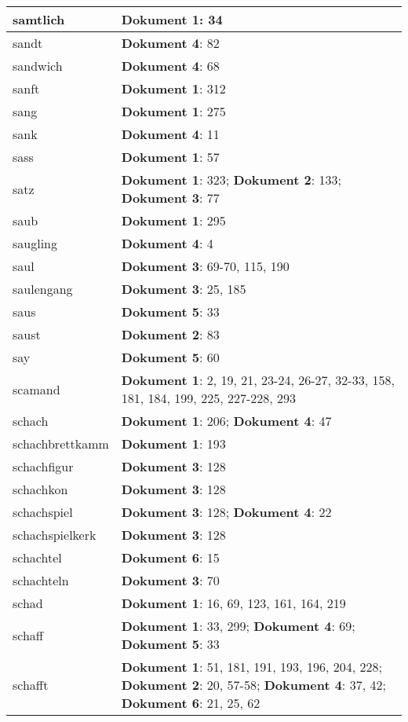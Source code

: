 \documentclass[a5paper]{article}
\begin{document}
\begin{longtable}[l]{|l|p{3in}|}
\hline
samtlich & \textbf{Dokument 1}: 34 \\
\hline
sandt & \textbf{Dokument 4}: 82 \\
\hline
sandwich & \textbf{Dokument 4}: 68 \\
\hline
sanft & \textbf{Dokument 1}: 312 \\
\hline
sang & \textbf{Dokument 1}: 275 \\
\hline
sank & \textbf{Dokument 4}: 11 \\
\hline
sass & \textbf{Dokument 1}: 57 \\
\hline
satz & \textbf{Dokument 1}: 323; \textbf{Dokument 2}: 133; \textbf{Dokument 3}: 77 \\
\hline
saub & \textbf{Dokument 1}: 295 \\
\hline
saugling & \textbf{Dokument 4}: 4 \\
\hline
saul & \textbf{Dokument 3}: 69-70, 115, 190 \\
\hline
saulengang & \textbf{Dokument 3}: 25, 185 \\
\hline
saus & \textbf{Dokument 5}: 33 \\
\hline
saust & \textbf{Dokument 2}: 83 \\
\hline
say & \textbf{Dokument 5}: 60 \\
\hline
scamand & \textbf{Dokument 1}: 2, 19, 21, 23-24, 26-27, 32-33, 158, 181, 184, 199, 225, 227-228, 293 \\
\hline
schach & \textbf{Dokument 1}: 206; \textbf{Dokument 4}: 47 \\
\hline
schachbrettkamm & \textbf{Dokument 1}: 193 \\
\hline
schachfigur & \textbf{Dokument 3}: 128 \\
\hline
schachkon & \textbf{Dokument 3}: 128 \\
\hline
schachspiel & \textbf{Dokument 3}: 128; \textbf{Dokument 4}: 22 \\
\hline
schachspielkerk & \textbf{Dokument 3}: 128 \\
\hline
schachtel & \textbf{Dokument 6}: 15 \\
\hline
schachteln & \textbf{Dokument 3}: 70 \\
\hline
schad & \textbf{Dokument 1}: 16, 69, 123, 161, 164, 219 \\
\hline
schaff & \textbf{Dokument 1}: 33, 299; \textbf{Dokument 4}: 69; \textbf{Dokument 5}: 33 \\
\hline
schafft & \textbf{Dokument 1}: 51, 181, 191, 193, 196, 204, 228; \textbf{Dokument 2}: 20, 57-58; \textbf{Dokument 4}: 37, 42; \textbf{Dokument 6}: 21, 25, 62 \\

\end{longtable}
\end{document}
